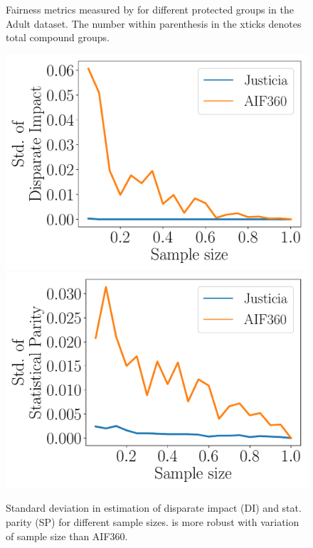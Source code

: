 \begin{figure}[t!]
\begin{minipage}{0.48\textwidth}
		\caption{Fairness metrics measured by {\justicia} for different protected groups in the Adult dataset. The number within parenthesis in the xticks denotes total compound groups.}
		\label{fairness_justicia_fig:protected_groups}
	\end{minipage}
	\hfill
	\begin{minipage}{0.48\textwidth}
		\includegraphics[scale=.15]{figures/fairness/justicia/sampling_DI_after_Adult_rw_LR_race.pdf}
		\hfill
		\includegraphics[scale=.15]{figures/fairness/justicia/sampling_SPD_after_Adult_rw_LR_race.pdf}
		\caption{Standard deviation in estimation of disparate impact (DI) and stat. parity (SP)  for different sample sizes. {\justicia} is more robust with variation of sample size than  AIF360. }
		\label{fairness_justicia_fig:sample-size}
	\end{minipage}
\end{figure}


